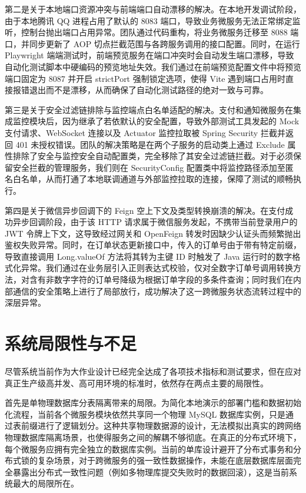 第二是关于本地端口资源冲突与前端端口自动漂移的解决。在本地开发调试阶段，由于本地腾讯 QQ 进程占用了默认的 8083 端口，导致业务微服务无法正常绑定监听，控制台抛出端口占用异常。团队通过代码重构，将业务微服务迁移至 8088 端口，并同步更新了 AOP 切点拦截范围与各跨服务调用的接口配置。同时，在运行 Playwright 端端测试时，前端预览服务在端口冲突时会自动发生端口漂移，导致自动化测试脚本中硬编码的预览地址失效。我们通过在前端预览配置文件中将预览端口固定为 8087 并开启 strictPort 强制锁定选项，使得 Vite 遇到端口占用时直接报错退出而不是漂移，从而确保了自动化测试路径的绝对一致与可靠。

第三是关于安全过滤链排除与监控端点白名单适配的解决。支付和通知微服务在集成监控模块后，因为继承了若依默认的安全配置，导致外部测试工具发起的 Mock 支付请求、WebSocket 连接以及 Actuator 监控拉取被 Spring Security 拦截并返回 401 未授权错误。团队的解决策略是在两个子服务的启动类上通过 Exclude 属性排除了安全与监控安全自动配置类，完全移除了其安全过滤链拦截。对于必须保留安全拦截的管理服务，我们则在 SecurityConfig 配置类中将监控路径添加至匿名白名单，从而打通了本地联调通道与外部监控拉取的连接，保障了测试的顺畅执行。

第四是关于微信异步回调下的 Feign 空上下文及类型转换崩溃的解决。在支付成功异步回调阶段，由于该 HTTP 请求属于微信服务发起，不携带当前登录用户的 JWT 令牌上下文，这导致经过网关和 OpenFeign 转发时因缺少认证头而频繁抛出鉴权失败异常。同时，在订单状态更新接口中，传入的订单号由于带有特定前缀，导致直接调用 Long.valueOf 方法将其转为主键 ID 时触发了 Java 运行时的数字格式化异常。我们通过在业务层引入正则表达式校验，仅对全数字订单号调用转换方法，对含有非数字字符的订单号降级为根据订单字段的多条件查询；同时我们在内部通信的安全策略上进行了局部放行，成功解决了这一跨微服务状态流转过程中的深层异常。

\section{系统局限性与不足}

尽管系统当前作为大作业设计已经完全达成了各项技术指标和测试要求，但在应对真正生产级高并发、高可用环境的标准时，依然存在两点主要的局限性。

首先是单物理数据库分表隔离带来的局限。为简化本地演示的部署门槛和数据初始化流程，当前各个微服务模块依然共享同一个物理 MySQL 数据库实例，只是通过表前缀进行了逻辑划分。这种共享物理数据源的设计，无法模拟出真实的跨网络物理数据库隔离场景，也使得服务之间的解耦不够彻底。在真正的分布式环境下，每个微服务应拥有完全独立的数据库实例。当前的单库设计避开了分布式事务和分布式锁的复杂场景，对于跨微服务的强一致性数据操作，未能在底层数据库层面完全暴露出分布式一致性问题（例如多物理库提交失败时的数据回滚），这是当前系统最大的局限所在。

